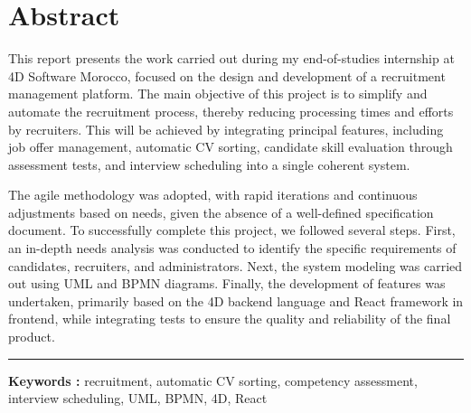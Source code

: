 \chapter*{Abstract}


\begin{spacing}{1.25}

This report presents the work carried out during my end-of-studies internship at 4D Software Morocco, focused on the design and development of a recruitment management platform. 
The main objective of this project is to simplify and 
automate the recruitment process, thereby reducing processing 
times and efforts by recruiters. This will be achieved by 
integrating principal features, including job offer management, automatic CV sorting, candidate skill evaluation through assessment tests, and interview scheduling into a single coherent system.
\newline

The agile methodology was adopted, with rapid iterations and continuous adjustments based on needs, given the absence of a well-defined specification document.
To successfully complete this project, we followed several 
steps. First, an in-depth needs analysis was conducted to identify the specific requirements of candidates, recruiters, and administrators.
 Next, the system modeling was carried out using UML 
 and BPMN diagrams. Finally, the development of features 
 was undertaken, primarily based on the 4D backend language 
 and React framework in frontend, while integrating tests 
 to ensure the quality and reliability of the final product.
\newline


\end{spacing}

\vspace{1cm}
\noindent\rule[2pt]{\textwidth}{0.5pt}
\textbf{Keywords :} recruitment, automatic CV sorting, competency assessment, interview scheduling, UML, BPMN, 4D, React
